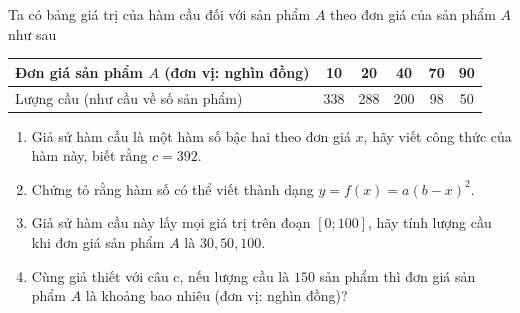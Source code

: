 \begin{bt}%
	Ta có bảng giá trị của hàm cầu đối với sản phẩm $ A $ theo đơn giá của sản phẩm $ A $ như sau \begin{center}
		
		
		\begin{tabular}{|l|c|c|c|c|c|}
			\hline
			Đơn giá sản phẩm $ A $ (đơn vị: nghìn đồng)& 10 & 20 & 40 &70  &90  \\
			\hline
			Lượng cầu (như cầu về số sản phẩm)& 338 & 288 &200  & 98  & 50  \\
			\hline
		\end{tabular}
	\end{center}
	\begin{enumerate}[\bf a]
		\item Giả sử hàm cầu là một hàm số bậc hai theo đơn giá $x$, hãy viết công thức của hàm này, biết rằng $c=392$.
		\item Chứng tỏ rằng hàm số có thể viết thành dạng $y=f(x)=a(b-x)^2$.
		\item Giả sử hàm cầu này lấy mọi giá trị trên đoạn $ [0; 100] $, hãy tính lượng cầu khi đơn giá sản phẩm $A$ là $30,50,100$.
		\item Cùng giả thiết với câu c, nếu lượng cầu là $ 150 $ sản phẩm thì đơn giá sản phẩm $ A $ là khoảng bao nhiêu (đơn vị: nghìn đồng)?
	\end{enumerate}
\end{bt}
